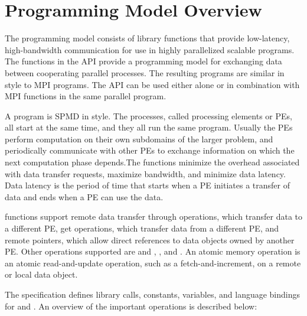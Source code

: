 \section{Programming Model Overview}
The \openshmem programming model consists of library functions that provide
low-latency, high-bandwidth communication  for  use  in  highly  parallelized 
scalable programs. The functions in the \openshmem \ac{API} provide a programming 
model for exchanging data between cooperating parallel processes. The resulting programs are similar 
in style to \ac{MPI} programs. The \openshmem \ac{API} can be used either alone 
or in combination with \ac{MPI} functions in the same parallel program.

A \openshmem program is \ac{SPMD} in style. The
\openshmem  processes,  called  processing elements or \ac{PE}s, all start at the
same time, and they all run the same program.  Usually the \ac{PE}s  perform
computation on their own subdomains of the larger problem, and periodically 
communicate with other \ac{PE}s to exchange information on which the
next computation phase depends.The \openshmem functions minimize the overhead associated with data transfer
requests, maximize bandwidth, and minimize data latency.  Data latency
is  the  period  of  time that starts when a \ac{PE} initiates a transfer of data 
and ends when a \ac{PE} can use the data.

\openshmem functions support remote data transfer through  operations, which  transfer data to a 
different \ac{PE}, get operations, which transfer data from a different \ac{PE}, and remote pointers, which 
allow direct  references  to  data objects owned by another \ac{PE}.  Other operations supported are  
 and , , and . 
An atomic memory operation  is an atomic read-and-update operation, such as a fetch-and-increment, on a remote
or local data object.

The \openshmem{} specification defines library calls, constants, variables, and language bindings for \Clang{} and \Fortran{}.
An overview of the important \openshmem{} operations is described below:

